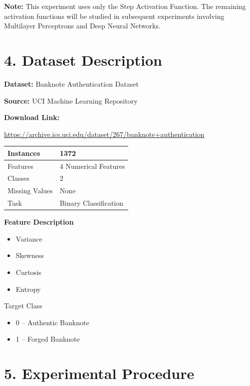 \documentclass[11pt]{article}
\begin{document}
\textbf{Note:} This experiment uses only the Step Activation Function. The remaining activation functions will be studied in subsequent experiments involving Multilayer Perceptrons and Deep Neural Networks.


\section*{4. Dataset Description}

\textbf{Dataset:} Banknote Authentication Dataset

\textbf{Source:} UCI Machine Learning Repository

\textbf{Download Link:}

\url{https://archive.ics.uci.edu/dataset/267/banknote+authentication}

\begin{center}
\begin{tabular}{|l|l|}
\hline
Instances & 1372\\
\hline
Features & 4 Numerical Features\\
\hline
Classes & 2\\
\hline
Missing Values & None\\
\hline
Task & Binary Classification\\
\hline
\end{tabular}
\end{center}

\textbf{Feature Description}

\begin{itemize}
\item Variance
\item Skewness
\item Curtosis
\item Entropy
\end{itemize}

Target Class

\begin{itemize}
\item 0 -- Authentic Banknote
\item 1 -- Forged Banknote
\end{itemize}


\section*{5. Experimental Procedure}
\end{document}
